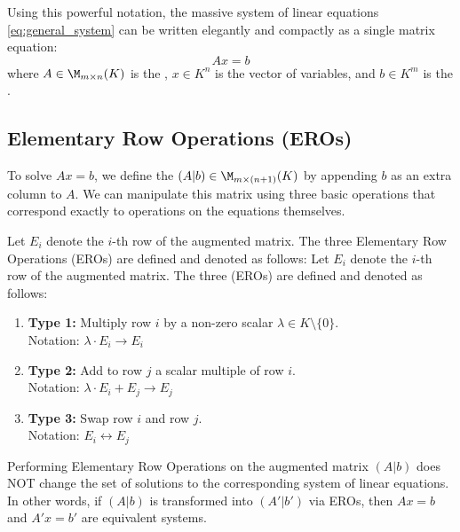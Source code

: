 Using this powerful notation, the massive system of linear equations \eqref{eq:general_system} can be written elegantly and compactly as a single matrix equation:
\begin{equation} \label{eq:matrix_equation}
A x = b
\end{equation}
where $A \in \M_{m \times n}(K)$ is the , $x \in K^n$ is the vector of variables, and $b \in K^m$ is the .

\subsection{Elementary Row Operations (EROs)}

To solve $A x = b$, we define the  $(A|b) \in \M_{m \times (n+1)}(K)$ by appending $b$ as an extra column to $A$. We can manipulate this matrix using three basic operations that correspond exactly to operations on the equations themselves.

\begin{definition}
Let $E_i$ denote the $i$-th row of the augmented matrix. The three Elementary Row Operations (EROs) are defined and denoted as follows:
Let $E_i$ denote the $i$-th row of the augmented matrix. The three  (EROs) are defined and denoted as follows:
\begin{enumerate}
    \item \textbf{Type 1:} Multiply row $i$ by a non-zero scalar $\lambda \in K \setminus \{0\}$. \\
    Notation: $\lambda \cdot E_i \to E_i$
    \item \textbf{Type 2:} Add to row $j$ a scalar multiple of row $i$. \\
    Notation: $\lambda \cdot E_i + E_j \to E_j$
    \item \textbf{Type 3:} Swap row $i$ and row $j$. \\
    Notation: $E_i \leftrightarrow E_j$
\end{enumerate}
\end{definition}

\begin{theorem}
Performing Elementary Row Operations on the augmented matrix $(A|b)$ does NOT change the set of solutions to the corresponding system of linear equations. In other words, if $(A|b)$ is transformed into $(A'|b')$ via EROs, then $Ax = b$ and $A'x = b'$ are equivalent systems.
\end{theorem}


